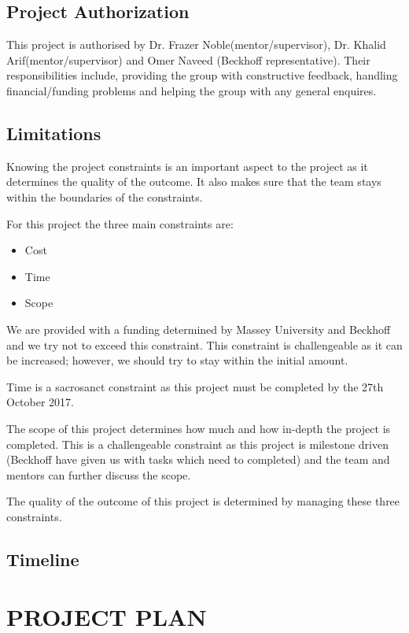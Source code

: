 \documentclass[a4paper, 10pt, conference]{IEEEconf}
\begin{document}
\subsection{Project Authorization}
This project is authorised by Dr. Frazer Noble(mentor/supervisor), Dr. Khalid Arif(mentor/supervisor) and Omer Naveed (Beckhoff representative). Their responsibilities include, providing the group with constructive feedback, handling financial/funding problems and helping the group with any general enquires. 

\subsection{Limitations}
Knowing the project constraints is an important aspect to the project as it determines the quality of the outcome. It also makes sure that the team stays within the boundaries of the constraints.

For this project the three main constraints are:
\begin{itemize}
	\item Cost
	\item Time
	\item Scope
\end{itemize}	

We are provided with a funding determined by Massey University and Beckhoff and we try not to exceed this constraint. This constraint is challengeable as it can be increased; however, we should try to stay within the initial amount.

Time is a sacrosanct constraint as this project must be completed by the 27th October 2017.

The scope of this project determines how much and how in-depth the project is completed. This is a challengeable constraint as this project is milestone driven (Beckhoff have given us with tasks which need to completed) and the team and mentors can further discuss the scope.

The quality of the outcome of this project is determined by managing these three constraints.

\subsection{Timeline}


\section{PROJECT PLAN}
\end{document}
